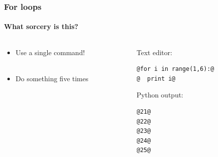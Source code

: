 \documentclass{beamer}
\begin{document}
\begin{frame}[fragile]
\frametitle{For loops}
\framesubtitle{What sorcery is this?}
\large
  \begin{columns}[T]
    \begin{column}{.5\textwidth} 


\begin{itemize}

 \item Use a single command! \\ \

\item{Do something five times}





\end{itemize}
     \end{column}
     
         \begin{column}{.5\textwidth} 
         Text editor:
\begin{lstlisting}[style=base]
@for i in range(1,6):@
@  print i@

\end{lstlisting}

\vfill

Python output:
\begin{lstlisting}[style=base]
@21@
@22@
@23@
@24@
@25@


\end{lstlisting}

    \end{column}
    \end{columns}

\end{frame}
\end{document}
